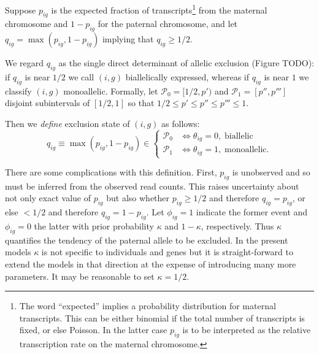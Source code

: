 \documentclass[letterpaper]{article}
\begin{document}
Suppose \(p_{ig}\) is the expected fraction of transcripts\footnote{The word
``expected'' implies a probability distribution for maternal transcripts.
This can be either binomial if the total number of transcripts is fixed, or
else Poisson.  In the latter case \(p_{ig}\) is to be interpreted as the
relative transcription rate on the maternal chromosome. } from the maternal
chromosome and \(1-p_{ig}\) for the paternal chromosome, and let
\(q_{ig}=\max(p_{ig},1-p_{ig})\) implying that \(q_{ig}\ge 1/2\).

We regard \(q_{ig}\) as the single direct determinant of
allelic exclusion (Figure TODO): if \(q_{ig}\) is near \(1/2\) we call \((i,g)\)
biallelically expressed, whereas if \(q_{ig}\) is near \(1\) we classify
\((i,g)\) monoallelic.  Formally, let \(\mathcal{P}_0 = [1/2, p')\) and
\(\mathcal{P}_1 = [p'', p''']\) disjoint subintervals of \([1/2,1]\) so that
\(1/2\le p'\le p''\le p'''\le 1\).

Then we \emph{define} exclusion state of \((i,g)\) as follows:
\begin{equation}
\label{eq:def-exclusion-state}
q_{ig} \equiv \max(p_{ig},1-p_{ig}) \in
\begin{cases}
\mathcal{P}_0 & \Leftrightarrow \theta_{ig}=0, \; \text{biallelic} \\
\mathcal{P}_1 & \Leftrightarrow \theta_{ig}=1, \; \text{monoallelic}.
\end{cases}
\end{equation}

There are some complications with this definition.  First, \(p_{ig}\) is
unobserved and so must be inferred from the observed read counts.  This raises
uncertainty about not only exact value of \(p_{ig}\) but also whether
\(p_{ig}\ge 1/2\) and therefore \(q_{ig}=p_{ig}\), or else \(<1/2\) and therefore
\(q_{ig}=1-p_{ig}\).  Let \(\phi_{ig}=1\) indicate the former event and
\(\phi_{ig}=0\) the latter with prior probability \(\kappa\) and
\(1-\kappa\), respectively.  Thus \(\kappa\) quantifies the tendency of the
paternal allele to be excluded. In the present models \(\kappa\) is not
specific to individuals and genes but it is straight-forward to extend the
models in that direction at the expense of introducing many more parameters.
It may be reasonable to set \(\kappa=1/2\).
\end{document}
